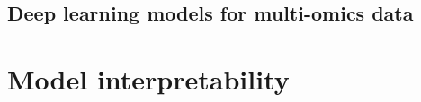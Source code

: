 \documentclass[../main.tex]{subfiles}
\begin{document}
 \subsection{Deep learning models for multi-omics data}




\section{Model interpretability}



\end{document}

